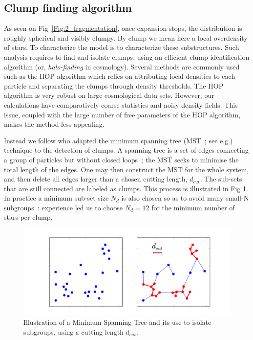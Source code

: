 \subsection{Clump finding algorithm}

As seen on Fig~\ref{Fig:2_fragmentation}, once expansion stops, the distribution is roughly spherical and visibly clumpy. By clump we mean here a local overdensity of stars. To characterize the model is to characterize these substructures. Such analysis requires to find and isolate clumps, using an efficient clump-identification algorithm (or, {\it halo-finding} in cosmology).  Several methods are commonly used such as the HOP algorithm \citep{Eisenstein1998,Skory2010} which relies on attributing local densities to each particle and separating the clumps through density thresholds. The HOP algorithm is very robust on large cosmological data sets. However, our calculations have comparatively coarse statistics and noisy density fields. This issue, coupled with the  large number of free parameters of the HOP algorithm, makes the method less appealing. 

Instead we follow \cite{Maschberger2010} who adapted the minimum spanning tree (MST~; see e.g.\citealt{Allison2009b,Olczak2011}) technique to the detection of clumps. A spanning tree is a set of edges connecting a group of  particles but without closed loops~; the MST seeks to minimise the total length of the edges. One may then construct the MST for the whole system, and then delete all edges larger than a chosen cutting length, $d_{cut}$. The sub-sets that are still connected  are labeled as clumps. This process is illustrated in Fig \ref{Fig:2_MST}. In practice a minimum sub-set size $N_d$  is also chosen so as to avoid many small-N subgroups~: experience led us to choose  $N_d = 12$ for the minimum number of stars per clump. 

\begin{figure}[h]
\begin{center}
\includegraphics[width=0.8\columnwidth]{Figures/2_MST.png}
\end{center}
\caption{Illustration of a Minimum Spanning Tree and its use to isolate subgroups, using a cutting length $d_{cut}$.}
\label{Fig:2_MST}
\end{figure}



